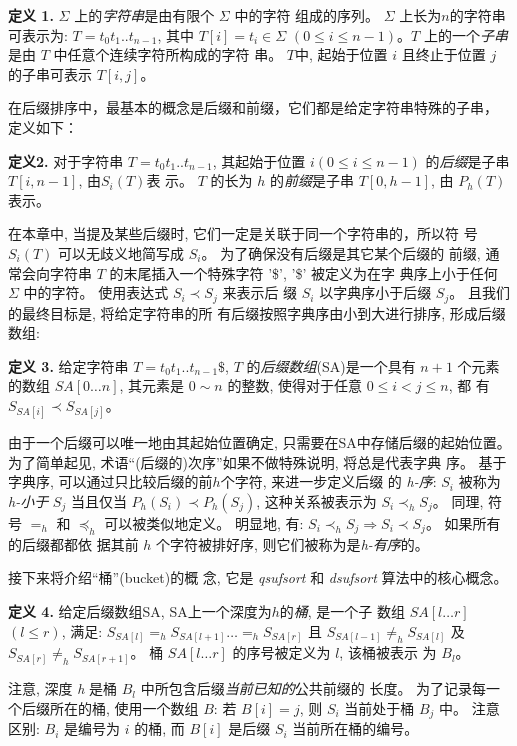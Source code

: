 \textbf{定义 1.} $\Sigma$ 上的\emph{字符串}是由有限个 $\Sigma$ 中的字符
组成的序列。 $\Sigma$ 上长为$n$的字符串可表示为: $T =
t_0t_1..t_{n-1}$, 其中 $T[i] = t_i \in \Sigma$ $(0 \leq i \leq
n-1)$。$T$ 上的一个\emph{子串}是由 $T$ 中任意个连续字符所构成的字符
串。 $T$中, 起始于位置 $i$ 且终止于位置 $j$ 的子串可表示 $T[i,j]$。

在后缀排序中，最基本的概念是后缀和前缀，它们都是给定字符串特殊的子串，
定义如下：

\textbf{定义2.} 对于字符串 $T = t_0t_1..t_{n-1}$, 其起始于位置
$i(0 \leq i \leq n-1)$ 的\emph{后缀}是子串 $T[i,n-1]$, 由$S_i(T)$表
示。  $T$ 的长为 $h$ 的\emph{前缀}是子串 $T[0,h-1]$, 由 $P_h(T)$ 表示。

在本章中, 当提及某些后缀时, 它们一定是关联于同一个字符串的，所以符
号 $S_i(T)$ 可以无歧义地简写成 $S_i$。 为了确保没有后缀是其它某个后缀的
前缀, 通常会向字符串 $T$ 的末尾插入一个特殊字符 '\$', '\$' 被定义为在字
典序上小于任何 $\Sigma$ 中的字符。 使用表达式 $S_i \prec S_j$ 来表示后
缀 $S_i$ 以字典序小于后缀 $S_j$。 且我们的最终目标是, 将给定字符串的所
有后缀按照字典序由小到大进行排序, 形成后缀数组:

\textbf{定义 3.} 给定字符串 $T = t_0t_1..t_{n-1}\$$,
$T$ 的\emph{后缀数组}(SA)是一个具有 $n+1$ 个元素的数组 $SA[0 \dots
n]$, 其元素是 $0 \sim n$ 的整数, 使得对于任意 $0 \leq i < j \leq n$, 都
有 $S_{SA[i]} \prec S_{SA[j]}$。

由于一个后缀可以唯一地由其起始位置确定, 只需要在SA中存储后缀的起始位置。
为了简单起见, 术语“(后缀的)次序”如果不做特殊说明, 将总是代表字典
序。 基于字典序, 可以通过只比较后缀的前$h$个字符, 来进一步定义后缀
的 \emph{h-序}: $S_i$ 被称为 \emph{h-小于} $S_j$ 当且仅当 $P_h(S_i)
\prec P_h(S_j)$, 这种关系被表示为 $S_i \prec_h
S_j$。  同理, 符号 $=_h$ 和 $\preceq_h$ 可以被类似地定义。 明显地, 有:
$S_i \prec_h S_j \Longrightarrow S_i \prec S_j$。 如果所有的后缀都都依
据其前 $h$ 个字符被排好序, 则它们被称为是\emph{h-有序}的。

接下来将介绍“桶”(bucket)的概
念, 它是 \emph{qsufsort} 和 \emph{dsufsort} 算法中的核心概念。

\textbf{定义 4.} 给定后缀数组SA, SA上一个深度为$h$的\emph{桶}, 是一个子
数组 $SA[l \dots r]$ $(l \leq r)$, 满足:
$S_{SA[l]} =_h S_{SA[l+1]}\dots =_h S_{SA[r]}$ 且
$S_{SA[l-1]} \neq_h S_{SA[l]}$ 及 $S_{SA[r]} \neq_h
S_{SA[r+1]}$。 桶 $SA[l \dots r]$ 的序号被定义为 $l$, 该桶被表示
为 $B_l$。

注意, 深度 \emph{h} 是桶 $B_l$ 中所包含后缀\emph{当前已知的}公共前缀的
长度。 为了记录每一个后缀所在的桶, 使用一个数组 $B$: 若 $B[i] =
j$, 则 $S_i$ 当前处于桶 $B_j$ 中。 注意区别: $B_i$ 是编号为 $i$ 的桶,
而 $B[i]$ 是后缀 $S_i$ 当前所在桶的编号。

